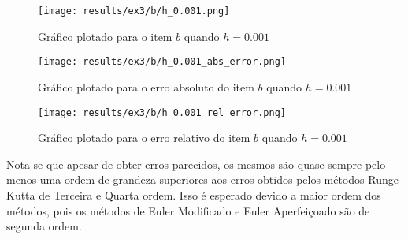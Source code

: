 \documentclass[12pt]{article}
\begin{document}
\begin{figure}[H]
    \texttt{[image: results/ex3/b/h\_0.001.png]}
    \caption{Gráfico plotado para o item $b$ quando $h=0.001$}
\end{figure}

\begin{figure}[H]
    \texttt{[image: results/ex3/b/h\_0.001\_abs\_error.png]}
    \caption{Gráfico plotado para o erro absoluto do item $b$ quando $h=0.001$}
\end{figure}

\begin{figure}[H]
    \texttt{[image: results/ex3/b/h\_0.001\_rel\_error.png]}
    \caption{Gráfico plotado para o erro relativo do item $b$ quando $h=0.001$}
\end{figure}

Nota-se que apesar de obter erros parecidos, os mesmos são quase sempre pelo menos uma ordem de grandeza superiores aos erros obtidos pelos métodos Runge-Kutta de Terceira e Quarta ordem. Isso é esperado devido a maior ordem dos métodos, pois os métodos de Euler Modificado e Euler Aperfeiçoado são de segunda ordem.
\end{document}
